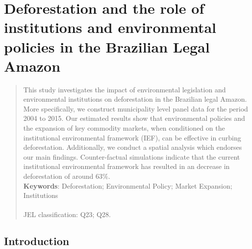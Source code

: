 
\chapter{Deforestation and the role of institutions and environmental policies in the Brazilian Legal Amazon}  %

\ifpdf
    \graphicspath{{Chapter1/Figs/}{Chapter1/}}
\else
    \graphicspath{{Chapter1/Figs/}{Chapter1/}}
\fi

\begin{abstract}
This study investigates the impact of environmental legislation and environmental institutions on deforestation in the Brazilian legal Amazon. More specifically, we construct municipality level panel data for the period 2004 to 2015.  Our estimated results show that environmental policies and the expansion of key commodity markets, when conditioned on the institutional environmental framework (IEF), can be effective in curbing deforestation. Additionally, we conduct a spatial analysis which endorses our main findings. Counter-factual simulations indicate that the current institutional environmental framework has resulted in an decrease in deforestation of around 63$\%$. \\
\textbf{Keywords}: Deforestation; Environmental Policy; Market Expansion; Institutions \\
\\
JEL classification: Q23; Q28.
\end{abstract}


\section{Introduction}
\label{S:1}

